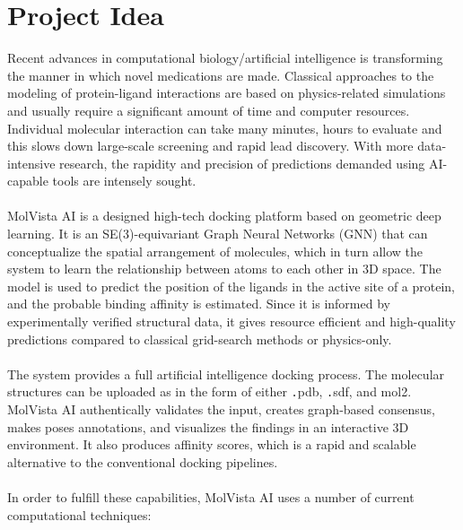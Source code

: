 \documentclass[12pt,a4]{report}
\begin{document}
\section{Project Idea}
\hspace*{0.3in}Recent advances in computational biology/artificial intelligence is transforming the manner in which novel medications are made. Classical approaches to the modeling of protein-ligand interactions are based on physics-related simulations and usually require a significant amount of time and computer resources. Individual molecular interaction can take many minutes, hours to evaluate and this slows down large-scale screening and rapid lead discovery. With more data-intensive research, the rapidity and precision of predictions demanded using AI-capable tools are intensely sought.
\\\\
\hspace*{0.3in}MolVista AI is a designed high-tech docking platform based on geometric deep learning. It is an SE(3)-equivariant Graph Neural Networks (GNN) that can conceptualize the spatial arrangement of molecules, which in turn allow the system to learn the relationship between atoms to each other in 3D space. The model is used to predict the position of the ligands in the active site of a protein, and the probable binding affinity is estimated. Since it is informed by experimentally verified structural data, it gives resource efficient and high-quality predictions compared to classical grid-search methods or physics-only.
\\\\
\hspace*{0.3in}The system provides a full artificial intelligence docking process. The molecular structures can be uploaded as in the form of either \texttt.pdb, \texttt.sdf, and mol2. MolVista AI authentically validates the input, creates graph-based consensus, makes poses annotations, and visualizes the findings in an interactive 3D environment. It also produces affinity scores, which is a rapid and scalable alternative to the conventional docking pipelines.
\\\\
In order to fulfill these capabilities, MolVista AI uses a number of current computational techniques:
\end{document}
